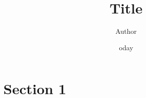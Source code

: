 \documentclass[11pt]{article}
\title{ Title}
\author{ Author }
\date{	oday}
\begin{document}
\maketitle
\lipsum[2-10]
\section{Section 1}
\lipsum[2-10]
\pagebreak
\end{document}
